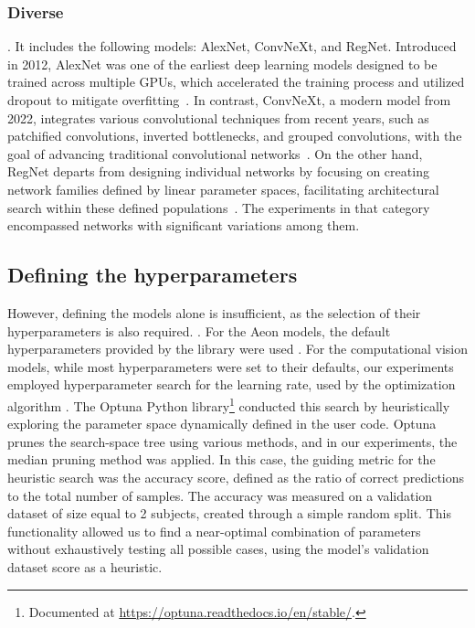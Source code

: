 \subsubsection{Diverse}

. It includes the following models: AlexNet, ConvNeXt, and RegNet. Introduced in 2012, AlexNet was one of the earliest deep learning models designed to be trained across multiple GPUs, which accelerated the training process and utilized dropout to mitigate overfitting~\cite{AlexNet}. In contrast, ConvNeXt, a modern model from 2022, integrates various convolutional techniques from recent years, such as patchified convolutions, inverted bottlenecks, and grouped convolutions, with the goal of advancing traditional convolutional networks~\cite{ConvNeXt}. On the other hand, RegNet departs from designing individual networks by focusing on creating network families defined by linear parameter spaces, facilitating architectural search within these defined populations~\cite{RegNet}. The experiments in that category encompassed networks with significant variations among them.

\subsection{Defining the hyperparameters}

However, defining the models alone is insufficient, as the selection of their hyperparameters is also required. . For the Aeon models, the default hyperparameters provided by the library were used . For the computational vision models, while most hyperparameters were set to their defaults, our experiments employed hyperparameter search for the learning rate, used by the optimization algorithm . The Optuna Python library\footnote{Documented at \url{https://optuna.readthedocs.io/en/stable/}.} conducted this search by heuristically exploring the parameter space dynamically defined in the user code. Optuna prunes the search-space tree using various methods, and in our experiments, the median pruning method was applied. In this case, the guiding metric for the heuristic search was the accuracy score, defined as the ratio of correct predictions to the total number of samples.   The accuracy was measured on a validation dataset of size equal to 2 subjects, created through a simple random split. This functionality allowed us to find a near-optimal combination of parameters without exhaustively testing all possible cases, using the model's validation dataset score as a heuristic.

